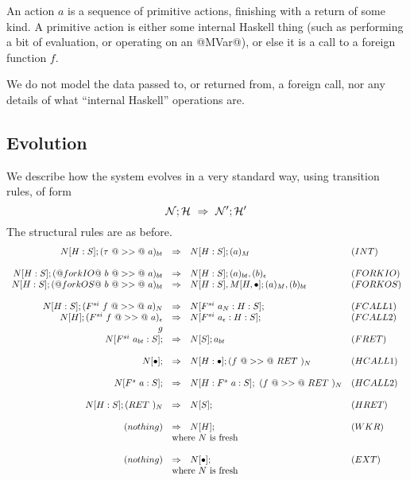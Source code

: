 \documentclass{article}
\newcommand{\NS}{{\cal N}}
\newcommand{\HS}{{\cal H}}
\newcommand{\hcall}{H}
\newcommand{\fcall}[2]{F^{#1}~#2}
\newcommand{\ret}[1]{RET~#1}
\begin{document}
An action $a$ is a sequence of primitive actions, finishing with a 
return of some kind.  A primitive action is either some internal Haskell
thing (such as performing a bit of evaluation, or operating on an @MVar@),
or else it is a call to a foreign function $f$.

We do not model the data passed to, or returned from, a foreign call, nor
any details of what ``internal Haskell'' operations are.  

\subsection{Evolution}

We describe how the system evolves in a very standard way, using 
transition rules, of form
$$
\NS ; \HS ~\Rightarrow~ \NS' ; \HS'
$$
The structural rules are as before.
$$
\begin{array}{rcll}
N[\hcall:S]; (\tau~@>>@~a)_{bt} 
        & \Rightarrow 
        & N[\hcall:S]; (a)_{M} & (INT) \\
\\
N[\hcall:S]; (@forkIO@~b~@>>@~a)_{bt} 
        & \Rightarrow 
        & N[\hcall:S]; (a)_{bt}, (b)_\epsilon & (FORKIO) \\
N[\hcall:S]; (@forkOS@~b~@>>@~a)_{bt}
        & \Rightarrow 
        & N[\hcall:S], M[\hcall,\bullet]; (a)_{M}, (b)_{bt} & (FORKOS) \\
\\
N[\hcall:S]; (\fcall{si}{f}~@>>@~a)_N 
        & \Rightarrow 
        & N[\fcall{si}{a_N}:\hcall:S];  & (FCALL1) \\
N[\hcall]; (\fcall{si}{f}~@>>@~a)_\epsilon 
        & \Rightarrow 
        & N[\fcall{si}{a_\epsilon}:\hcall:S];  & (FCALL2) \\
g\\
N[\fcall{si}{a_{bt}}:S];  
        & \Rightarrow 
        & N[S]; a_{bt} & (FRET) \\
\\
N[\bullet];
        & \Rightarrow 
        & N[\hcall:\bullet];  (f ~@>>@~ \ret{})_{N} & (HCALL1) \\
\\
N[\fcall{s}{a} : S]; 
        & \Rightarrow 
        & N[\hcall : \fcall{s}{a} : S]; ~ (f ~@>>@~ \ret{})_{N} & (HCALL2) \\
 \\
N[\hcall : S]; (\ret{})_N
        & \Rightarrow 
        & N[S]; & (HRET) \\
\\
(nothing)
        & \Rightarrow 
        & N[\hcall]; & (WKR) \\
        & \multicolumn{2}{l}{\mbox{where $N$ is fresh}} \\
\\
(nothing)
        & \Rightarrow 
        & N[\bullet]; & (EXT) \\
        & \multicolumn{2}{l}{\mbox{where $N$ is fresh}} \\
\end{array}
$$
\end{document}
